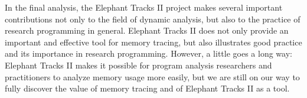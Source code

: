 In the final analysis, the Elephant Tracks II project makes several important contributions not only to the field of dynamic analysis, but also to the
practice of research programming in general. Elephant Tracks II does not only provide an important and effective tool for memory tracing, but also
illustrates good practice and its importance in research programming. However, a little goes a long way: Elephant Tracks II makes it possible for program
analysis researchers and practitioners to analyze memory usage more easily, but we are still on our way to fully discover the value of memory tracing and of
Elephant Tracks II as a tool.
